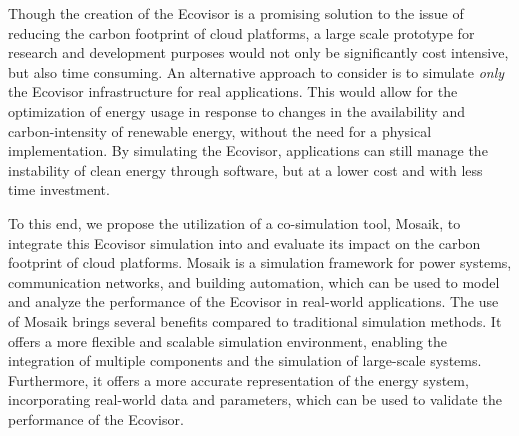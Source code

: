 Though the creation of the Ecovisor is a promising solution to the issue of
reducing the carbon footprint of cloud platforms, a large scale prototype for
research and development purposes would not only be significantly cost
intensive, but also time consuming. An alternative approach to consider is to
simulate \emph{only} the Ecovisor infrastructure for real applications. This
would allow for the optimization of energy usage in response to changes in the
availability and carbon-intensity of renewable energy, without the need for a
physical implementation. By simulating the Ecovisor, applications can still
manage the instability of clean energy through software, but at a lower cost and
with less time investment.
\medskip

To this end, we propose the utilization of a co-simulation tool, Mosaik, to
integrate this Ecovisor simulation into and evaluate its impact on the carbon
footprint of cloud platforms. Mosaik is a simulation framework for power
systems, communication networks, and building automation, which can be used to
model and analyze the performance of the Ecovisor in real-world applications.
The use of Mosaik brings several benefits compared to traditional simulation
methods. It offers a more flexible and scalable simulation environment, enabling
the integration of multiple components and the simulation of large-scale
systems. Furthermore, it offers a more accurate representation of the energy
system, incorporating real-world data and parameters, which can be used to
validate the performance of the Ecovisor.
